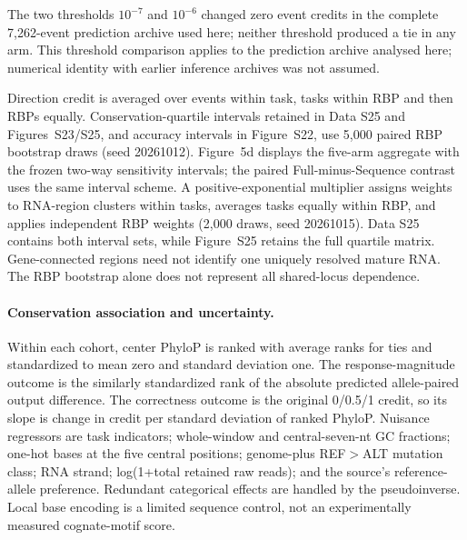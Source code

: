 The two thresholds $10^{-7}$ and $10^{-6}$ changed zero event credits in the complete 7,262-event prediction archive used here; neither threshold produced a tie in any arm. This threshold comparison applies to the prediction archive analysed here; numerical identity with earlier inference archives was not assumed.

Direction credit is averaged over events within task, tasks within RBP and then RBPs equally. Conservation-quartile intervals retained in Data S25 and Figures~S23/S25, and accuracy intervals in Figure~S22, use 5,000 paired RBP bootstrap draws (seed 20261012). Figure~5d displays the five-arm aggregate with the frozen two-way sensitivity intervals; the paired Full-minus-Sequence contrast uses the same interval scheme. A positive-exponential multiplier assigns weights to RNA-region clusters within tasks, averages tasks equally within RBP, and applies independent RBP weights (2,000 draws, seed 20261015). Data S25 contains both interval sets, while Figure~S25 retains the full quartile matrix. Gene-connected regions need not identify one uniquely resolved mature RNA. The RBP bootstrap alone does not represent all shared-locus dependence.

\paragraph{Conservation association and uncertainty.} Within each cohort, center PhyloP is ranked with average ranks for ties and standardized to mean zero and standard deviation one. The response-magnitude outcome is the similarly standardized rank of the absolute predicted allele-paired output difference. The correctness outcome is the original 0/0.5/1 credit, so its slope is change in credit per standard deviation of ranked PhyloP. Nuisance regressors are task indicators; whole-window and central-seven-nt GC fractions; one-hot bases at the five central positions; genome-plus REF$>$ALT mutation class; RNA strand; log(1+total retained raw reads); and the source's reference-allele preference. Redundant categorical effects are handled by the pseudoinverse. Local base encoding is a limited sequence control, not an experimentally measured cognate-motif score.

